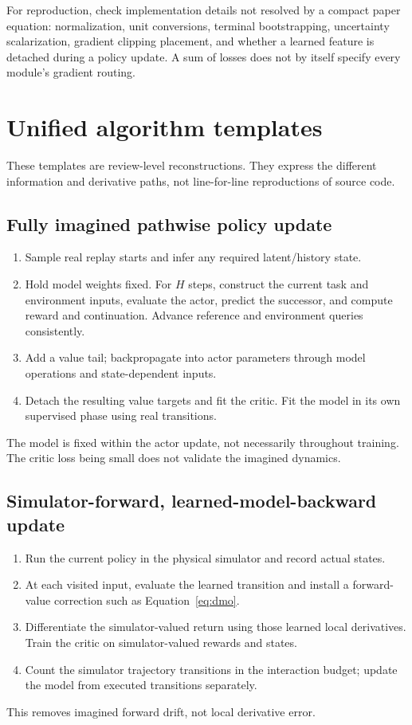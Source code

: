 For reproduction, check implementation details not resolved by a compact paper
equation: normalization, unit conversions, terminal bootstrapping, uncertainty
scalarization, gradient clipping placement, and whether a learned feature is
detached during a policy update. A sum of losses does not by itself specify
every module's gradient routing.

\section{Unified algorithm templates}\label{app:algorithms}
These templates are review-level reconstructions. They express the different
information and derivative paths, not line-for-line reproductions of source code.

\subsection{Fully imagined pathwise policy update}
\begin{enumerate}
\item Sample real replay starts and infer any required latent/history state.
\item Hold model weights fixed. For $H$ steps, construct the current task and
environment inputs, evaluate the actor, predict the successor, and compute reward
and continuation. Advance reference and environment queries consistently.
\item Add a value tail; backpropagate into actor parameters through model
operations and state-dependent inputs.
\item Detach the resulting value targets and fit the critic. Fit the model in
its own supervised phase using real transitions.
\end{enumerate}
The model is fixed within the actor update, not necessarily throughout training.
The critic loss being small does not validate the imagined dynamics.

\subsection{Simulator-forward, learned-model-backward update}
\begin{enumerate}
\item Run the current policy in the physical simulator and record actual states.
\item At each visited input, evaluate the learned transition and install a
forward-value correction such as Equation~\eqref{eq:dmo}.
\item Differentiate the simulator-valued return using those learned local
derivatives. Train the critic on simulator-valued rewards and states.
\item Count the simulator trajectory transitions in the interaction budget;
update the model from executed transitions separately.
\end{enumerate}
This removes imagined forward drift, not local derivative error.

